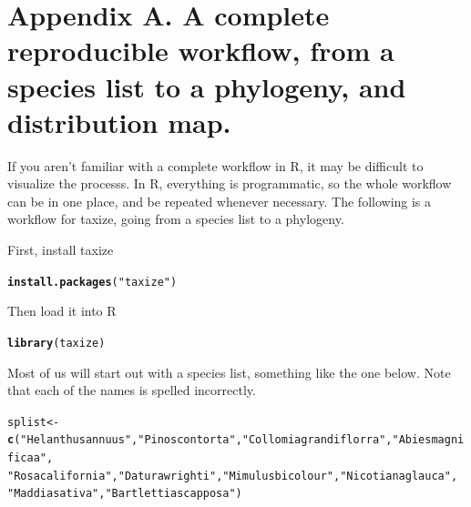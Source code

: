 \documentclass[letterpaper,superscriptaddress,showkeys,longbibliography,10pt]{revtex4-1}\usepackage{graphicx, color}
\makeatletter
\newcommand{\hlfunctioncall}[1]{\textcolor[rgb]{0.501960784313725,0,0.329411764705882}{\textbf{#1}}}%
\newcommand{\hlstring}[1]{\textcolor[rgb]{0.6,0.6,1}{#1}}%
\newenvironment{kframe}{%
 \def\at@end@of@kframe{}%
 \ifinner\ifhmode%
  \def\at@end@of@kframe{\end{minipage}}%
  \begin{minipage}{\columnwidth}%
 \fi\fi%
 \def\FrameCommand##1{\hskip\@totalleftmargin \hskip-\fboxsep
 \colorbox{shadecolor}{##1}\hskip-\fboxsep
     \hskip-\linewidth \hskip-\@totalleftmargin \hskip\columnwidth}%
 \MakeFramed {\advance\hsize-\width
   \@totalleftmargin\z@ \linewidth\hsize
   \@setminipage}}%
 {\par\unskip\endMakeFramed%
 \at@end@of@kframe}
\newenvironment{knitrout}{}{} %
\makeatother
\begin{document}
\section{Appendix A. A complete reproducible workflow, from a species list to a phylogeny, and distribution map.}

If you aren't familiar with a complete workflow in R, it may be difficult to visualize the processs. In R, everything is programmatic, so the whole workflow can be in one place, and be repeated whenever necessary. The following is a workflow for taxize, going from a species list to a phylogeny. 


First, install taxize

\begin{knitrout}
\color{fgcolor}\begin{kframe}
\begin{alltt}
\hlfunctioncall{install.packages}(\hlstring{"taxize"})
\end{alltt}
\end{kframe}
\end{knitrout}


Then load it into R

\begin{knitrout}
\color{fgcolor}\begin{kframe}
\begin{alltt}
\hlfunctioncall{library}(taxize)
\end{alltt}
\end{kframe}
\end{knitrout}


Most of us will start out with a species list, something like the one below. Note that each of the names is spelled incorrectly.

\begin{knitrout}
\color{fgcolor}\begin{kframe}
\begin{alltt}
splist <- \hlfunctioncall{c}(\hlstring{"Helanthus annuus"}, \hlstring{"Pinos contorta"}, \hlstring{"Collomia grandiflorra"}, \hlstring{"Abies magnificaa"}, 
    \hlstring{"Rosa california"}, \hlstring{"Datura wrighti"}, \hlstring{"Mimulus bicolour"}, \hlstring{"Nicotiana glauca"}, 
    \hlstring{"Maddia sativa"}, \hlstring{"Bartlettia scapposa"})
\end{alltt}
\end{kframe}
\end{knitrout}
\end{document}
